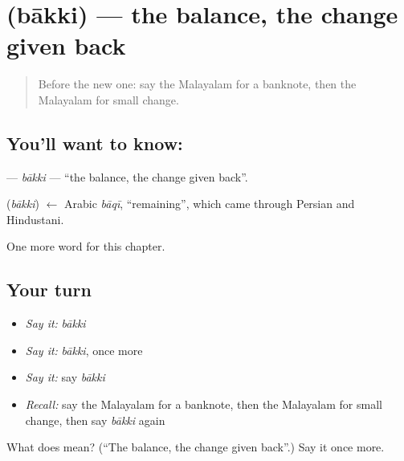 \section[\texorpdfstring{\ml{ബാക്കി} (bākki)}{ബാക്കി (bākki)}]{ (bākki) — the balance, the change given back}

\label{lesson:ML-C219-bakki}



\begin{quote}
Before the new one: say the Malayalam for a banknote, then the Malayalam for small change.
\end{quote}

\subsection*{You'll want to know: }
\textbf{} — \emph{bākki} — \textquotedblleft{}the balance, the change given back\textquotedblright{}.

\begin{cousinweb}
\textbf{} (\emph{bākki}) $\leftarrow$ Arabic \emph{bāqī}, \textquotedblleft{}remaining\textquotedblright{}, which came through Persian and Hindustani.
\end{cousinweb}

\begin{grammarlens}[title={What you've built}]
One more word for this chapter.
\end{grammarlens}

\subsection*{Your turn}
\begin{itemize}
\raggedright
  \item \emph{Say it:} \emph{bākki}
  \item \emph{Say it:} \emph{bākki}, once more
  \item \emph{Say it:} say \emph{bākki}
  \item \emph{Recall:} say the Malayalam for a banknote, then the Malayalam for small change, then say \emph{bākki} again
\end{itemize}

\begin{tcolorbox}[breakable,colback=teal!4,colframe=teal!35!black,title={Before you move on}]
What does  mean? (\textquotedblleft{}The balance, the change given back\textquotedblright{}.) Say it once more.
\end{tcolorbox}
